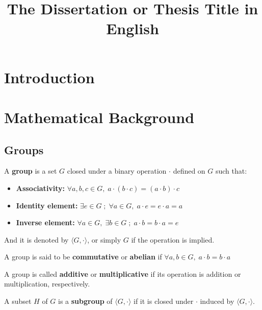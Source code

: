 \documentclass[Ingles]{ic-tese-v3}
\date{}
\title{}
\begin{document}

\title{The Dissertation or Thesis Title in English}


\mestrado


\paginasiniciais

\chapter{Introduction}
\label{sec:org1d79cb0}

\chapter{Mathematical Background}
\label{sec:org3d5629b}

\section{Groups}
\label{sec:org7f3a9d3}

   \begin{definition}
  A \textbf{group} is a set $G$ closed under a binary operation $\cdot$ defined on $G$ such
  that:
  \begin{itemize}
  \item \textbf{Associativity: } $\forall a,b,c \in G, \; a\cdot(b\cdot c) = (a\cdot b)\cdot c$
  \item \textbf{Identity element: } $\exists e \in G \; ; \; \forall a \in G, \; a\cdot e = e\cdot a = a$
  \item \textbf{Inverse element: } $\forall a \in G, \; \exists b \in G \; ; \; a\cdot b = b \cdot a = e$
  \end{itemize}
And it is denoted by $\langle G,\cdot\rangle$, or simply $G$ if the operation is implied.
\end{definition}

\begin{definition}
  A group is said to be \textbf{commutative} or \textbf{abelian}
  if $\forall a, b \in G, \; a\cdot b = b\cdot a$
\end{definition}

\noindent
A group is called \textbf{additive} or \textbf{multiplicative} if its
operation is addition or multiplication, respectively.

\begin{definition}
  A subset $H$ of $G$ is a \textbf{subgroup} of $\langle G,\cdot \rangle$ if it is
  closed under $\cdot$ induced by $\langle G,\cdot \rangle$.
\end{definition}
\end{document}
